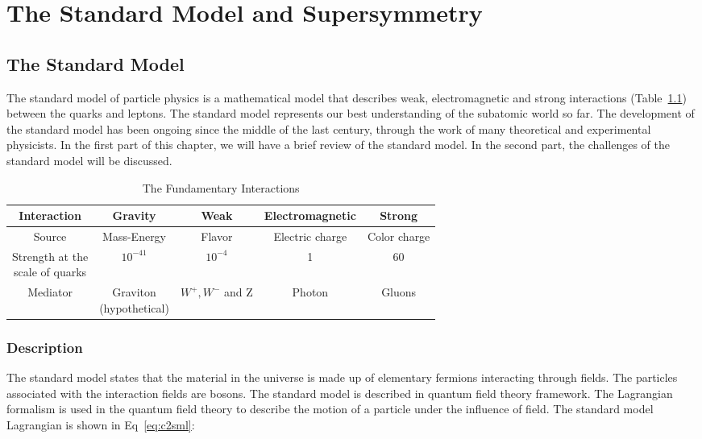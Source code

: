 \chapter{The Standard Model and Supersymmetry}
\clearpage
\section{The Standard Model}
The standard model of particle physics is a mathematical model that describes weak, electromagnetic and strong interactions (Table~\ref{tab:c24ei}) between the quarks and leptons. The standard model represents our best understanding of the subatomic world so far. The development of the standard model has been ongoing since the middle of the last century, through the work of many theoretical and experimental physicists. In the first part of this chapter, we will have a brief review of the standard model. In the second part, the challenges of the standard model will be discussed. 

\begin{table}[htbp]
\fontsize{10 pt}{1.2 em}
\selectfont
\begin{centering}
\caption{\label{tab:c24ei} The Fundamentary Interactions}
\hspace*{-4ex}
\begin{tabular}{|c|c|c|c|c|}
\hline
Interaction                                      & Gravity & Weak & Electromagnetic & Strong \\
\hline
Source                                           & Mass-Energy & Flavor & Electric charge & Color charge \\
\hline
\specialcell{Strength at the \\ scale of quarks} & $10^{-41}$ & $10^{-4}$ & 1 & 60 \\
\hline
Mediator                                         & \specialcell{Graviton\\(hypothetical)} & $W^{+},W^{-}$ and Z & Photon & Gluons \\
\hline
\end{tabular}
\par\end{centering}
\end{table}

\clearpage
\subsection{Description}

The standard model states that the material in the universe is made up of elementary fermions interacting through fields. The particles associated with the interaction fields are bosons. The standard model is described in quantum field theory framework. The Lagrangian formalism is used in the quantum field theory to describe the motion of a particle under the influence of field. The standard model Lagrangian is shown in Eq~\ref{eq:c2sml}: 

